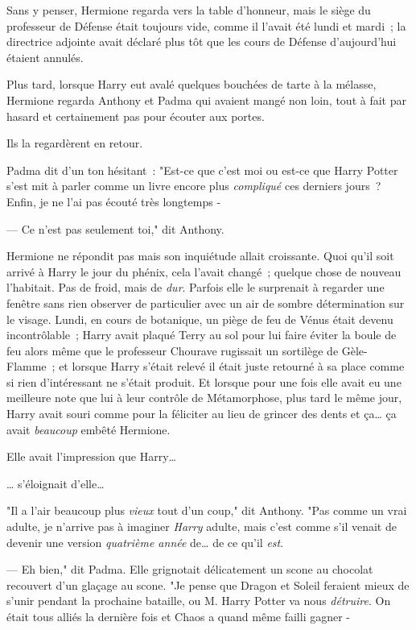 Sans y penser, Hermione regarda vers la table d'honneur, mais le siège du professeur de Défense était toujours vide, comme il l'avait été lundi et mardi~; la directrice adjointe avait déclaré plus tôt que les cours de Défense d'aujourd'hui étaient annulés.

Plus tard, lorsque Harry eut avalé quelques bouchées de tarte à la mélasse, Hermione regarda Anthony et Padma qui avaient mangé non loin, tout à fait par hasard et certainement pas pour écouter aux portes.

Ils la regardèrent en retour.

Padma dit d'un ton hésitant~: "Est-ce que c'est moi ou est-ce que Harry Potter s'est mit à parler comme un livre encore plus \emph{compliqué} ces derniers jours~? Enfin, je ne l'ai pas écouté très longtemps -

--- Ce n'est pas seulement toi," dit Anthony.

Hermione ne répondit pas mais son inquiétude allait croissante. Quoi qu'il soit arrivé à Harry le jour du phénix, cela l'avait changé~; quelque chose de nouveau l'habitait. Pas de froid, mais de \emph{dur}. Parfois elle le surprenait à regarder une fenêtre sans rien observer de particulier avec un air de sombre détermination sur le visage. Lundi, en cours de botanique, un piège de feu de Vénus était devenu incontrôlable~; Harry avait plaqué Terry au sol pour lui faire éviter la boule de feu alors même que le professeur Chourave rugissait un sortilège de Gèle-Flamme~; et lorsque Harry s'était relevé il était juste retourné à sa place comme si rien d'intéressant ne s'était produit. Et lorsque pour une fois elle avait eu une meilleure note que lui à leur contrôle de Métamorphose, plus tard le même jour, Harry avait souri comme pour la féliciter au lieu de grincer des dents et ça… ça avait \emph{beaucoup} embêté Hermione.

Elle avait l'impression que Harry…

… s'éloignait d'elle…

"Il a l'air beaucoup plus \emph{vieux} tout d'un coup," dit Anthony. "Pas comme un vrai adulte, je n'arrive pas à imaginer \emph{Harry} adulte, mais c'est comme s'il venait de devenir une version \emph{quatrième année} de… de ce qu'il \emph{est}.

--- Eh bien," dit Padma. Elle grignotait délicatement un scone au chocolat recouvert d'un glaçage au scone. "Je pense que Dragon et Soleil feraient mieux de s'unir pendant la prochaine bataille, ou M. Harry Potter va nous \emph{détruire}. On était tous alliés la dernière fois et Chaos a quand même failli gagner -

